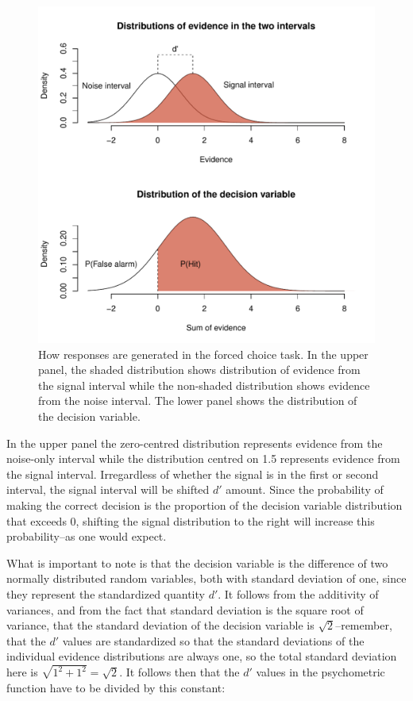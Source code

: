 \documentclass{article}\usepackage{knitr}
\begin{document}
\begin{figure}[!htb]
\centering
\begin{knitrout}
\color{fgcolor}
\includegraphics[width=\maxwidth]{figure/unnamed-chunk-6-1} 

\end{knitrout}
\caption{How responses are generated in the forced choice task. In the upper panel, the shaded distribution shows distribution of evidence from the signal interval while the non-shaded distribution shows evidence from the noise interval. The lower panel shows the distribution of the decision variable. }
\label{fig:2AFC}
\end{figure}

In the upper panel the zero-centred distribution represents evidence from the noise-only interval while the distribution centred on 1.5 represents evidence from the signal interval. Irregardless of whether the signal is in the first or second interval, the signal interval will be shifted $d'$ amount. Since the probability of making the correct decision is the proportion of the decision variable distribution that exceeds 0, shifting the signal distribution to the right will increase this probability--as one would expect.

What is important to note is that the decision variable is the difference of two normally distributed random variables, both with standard  deviation of one, since they represent the standardized quantity $d'$. It follows from the additivity of variances, and from the fact that standard deviation is the square root of variance, that the standard deviation of the decision variable is $\sqrt{2}$--remember, that the $d'$ values are standardized  so that the standard deviations of the individual evidence distributions are always one, so the total standard deviation here is $\sqrt{1^2 + 1^2} = \sqrt{2}$. It follows then that the $d'$ values in the psychometric function have to be divided by this constant:
\end{document}
